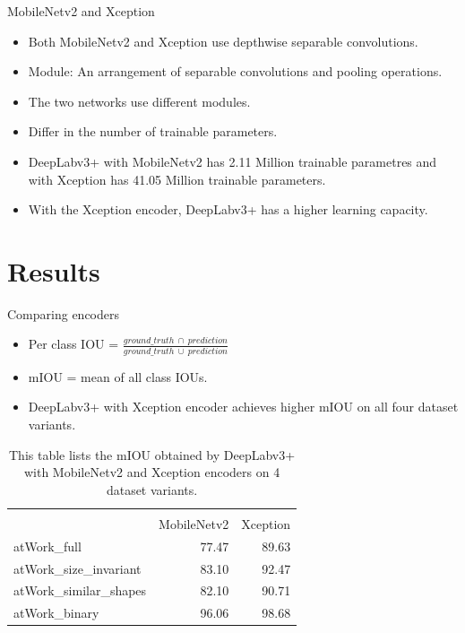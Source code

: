 \documentclass{beamer}
\begin{document}
\begin{frame}{MobileNetv2 and Xception}

	\begin{small}
		\begin{itemize}
			\item Both MobileNetv2 and Xception use depthwise separable convolutions.
			\item Module: An arrangement of separable convolutions and pooling operations.
			\item The two networks use different modules.
			\item Differ in the number of trainable parameters.
			\item DeepLabv3+ with MobileNetv2 has 2.11 Million trainable parametres and with Xception has 41.05 Million trainable parameters.
			\item With the Xception encoder, DeepLabv3+ has a higher learning capacity.
		\end{itemize}
	\end{small}

\end{frame}


\section{Results}

\begin{frame}{Comparing encoders}
	\begin{small}
		\begin{itemize}
			\item 
		Per class IOU = $\frac{ground\_truth \: \cap \: prediction}{ground\_truth \: \cup \: prediction}$
			\item mIOU = mean of all class IOUs.
			\item DeepLabv3+ with Xception encoder achieves higher mIOU on all four dataset variants.
		\end{itemize}
	
		\begin{table}[h]
			\begin{tabular}{|l|r|r|}
			\hline
			\multicolumn{ 1}{|l|}{\makecell{\textbf{Dataset variant}}} & \multicolumn{ 2}{l|}{\makecell{\textbf{mIOU in \%}}} \\ \cline{ 2- 3}
			\multicolumn{ 1}{|l|}{} & \multicolumn{1}{l|}{MobileNetv2} & 			\multicolumn{1}{l|}{Xception} \\ \hline
			atWork\_full & 77.47 & 89.63 \\ \hline
			atWork\_size\_invariant & 83.10 & 92.47 \\ \hline
			atWork\_similar\_shapes & 82.10 & 90.71 \\ \hline
			atWork\_binary & 96.06 & 98.68 \\ \hline
			\end{tabular}
			\captionsetup{justification=centering,margin=2cm}
			\caption{This table lists the mIOU obtained by DeepLabv3+ with MobileNetv2 and Xception encoders on 4 dataset variants.} 
			\label{Table:vars}
		\end{table}
	\end{small}

\end{frame}
\end{document}
